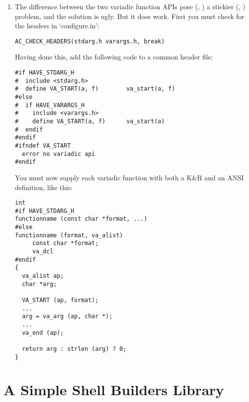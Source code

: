 \begin{enumerate}
\item The difference between the two variadic
function APIs pose ({\McQ{}}, {\MeQ{}})
a stickier ({\MlQ{}}, {\MkQ{}}) problem, and the solution is ugly. But it does work.
First you must check for the headers in `configure.in': 

\begin{Verbatim}[frame=single]
AC_CHECK_HEADERS(stdarg.h varargs.h, break)
\end{Verbatim}

Having done this, add the following code to a common header file: 

\begin{Verbatim}[frame=single]
#if HAVE_STDARG_H
#  include <stdarg.h>
#  define VA_START(a, f)        va_start(a, f)
#else
#  if HAVE_VARARGS_H
#    include <varargs.h>
#    define VA_START(a, f)      va_start(a)
#  endif
#endif
#ifndef VA_START
  error no variadic api
#endif
\end{Verbatim}

You must now supply each variadic function with both a K\&R and an ANSI 
definition, like this: 

\begin{Verbatim}[frame=single]
int
#if HAVE_STDARG_H
functionname (const char *format, ...)
#else
functionname (format, va_alist)
     const char *format;
     va_dcl
#endif
{
  va_alist ap;
  char *arg;

  VA_START (ap, format);
  ...
  arg = va_arg (ap, char *);
  ...
  va_end (ap);

  return arg : strlen (arg) ? 0;
}
\end{Verbatim}

\end{enumerate}

\section{A Simple Shell Builders Library}

